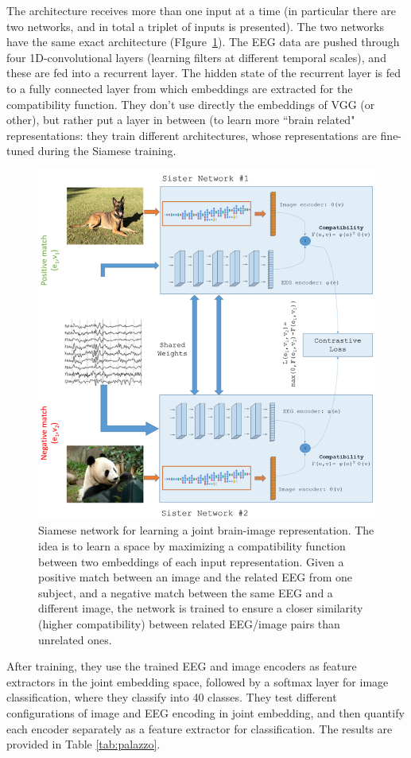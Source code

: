 The architecture receives more than one input at a time (in particular there are two networks, and in total a triplet of inputs is presented). The two networks have the same exact architecture (FIgure~\ref{fig:palazzo}). The EEG data are pushed through four 1D-convolutional layers (learning filters at different temporal scales), and these are fed into a recurrent layer. The hidden state of the recurrent layer is fed to a fully connected layer from which embeddings are extracted for the compatibility function.
They don't use directly the embeddings of VGG (or other), but rather put a layer in between (to learn more ``brain related" representations: they train different architectures, whose representations are fine-tuned during the Siamese training.

\begin{figure}[!ht]
    \centering
    \captionsetup{width=.8\linewidth}
    \includegraphics[width=0.6\linewidth]{images/palazzo.png}
    \caption{Siamese network for learning a joint brain-image representation. The idea is to learn a space by maximizing a compatibility function between two embeddings of each input representation. Given a positive match between an image and the related EEG from one subject, and a negative match between the same EEG and a different image, the network is trained to ensure a closer similarity (higher compatibility) between related EEG/image pairs than unrelated ones.}
    \label{fig:palazzo}
\end{figure}

After training, they use the trained EEG and image encoders as feature extractors in the joint embedding space, followed by a softmax layer for image classification, where they classify into 40 classes. They test different configurations of image and EEG encoding in joint embedding, and then quantify each encoder separately as a feature extractor for classification. The results are provided in Table \ref{tab:palazzo}.

